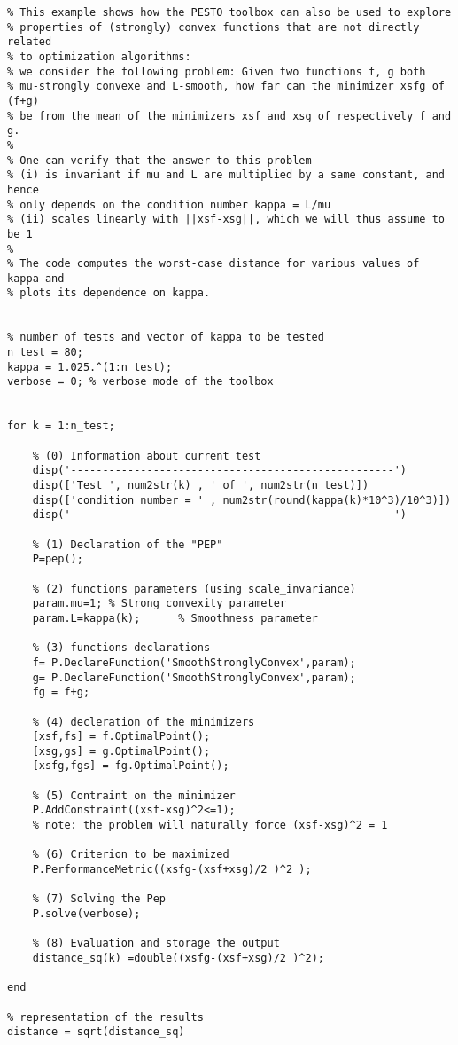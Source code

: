 \documentclass[11pt,a4paper]{article}
\begin{document}
\begin{lstlisting}
% This example shows how the PESTO toolbox can also be used to explore
% properties of (strongly) convex functions that are not directly related
% to optimization algorithms:
% we consider the following problem: Given two functions f, g both
% mu-strongly convexe and L-smooth, how far can the minimizer xsfg of (f+g)
% be from the mean of the minimizers xsf and xsg of respectively f and g.
%
% One can verify that the answer to this problem
% (i) is invariant if mu and L are multiplied by a same constant, and hence
% only depends on the condition number kappa = L/mu
% (ii) scales linearly with ||xsf-xsg||, which we will thus assume to be 1
%
% The code computes the worst-case distance for various values of kappa and
% plots its dependence on kappa.


% number of tests and vector of kappa to be tested
n_test = 80;
kappa = 1.025.^(1:n_test);
verbose = 0; % verbose mode of the toolbox


for k = 1:n_test;

	% (0) Information about current test
	disp('---------------------------------------------------')
	disp(['Test ', num2str(k) , ' of ', num2str(n_test)])
	disp(['condition number = ' , num2str(round(kappa(k)*10^3)/10^3)])
	disp('---------------------------------------------------')

	% (1) Declaration of the "PEP"
	P=pep();

	% (2) functions parameters (using scale_invariance)
	param.mu=1;	% Strong convexity parameter
	param.L=kappa(k);      % Smoothness parameter

	% (3) functions declarations
	f= P.DeclareFunction('SmoothStronglyConvex',param);
	g= P.DeclareFunction('SmoothStronglyConvex',param);
	fg = f+g;

	% (4) decleration of the minimizers
	[xsf,fs] = f.OptimalPoint();
	[xsg,gs] = g.OptimalPoint();
	[xsfg,fgs] = fg.OptimalPoint();

	% (5) Contraint on the minimizer
	P.AddConstraint((xsf-xsg)^2<=1);
	% note: the problem will naturally force (xsf-xsg)^2 = 1

	% (6) Criterion to be maximized
	P.PerformanceMetric((xsfg-(xsf+xsg)/2 )^2 );

	% (7) Solving the Pep
	P.solve(verbose);

	% (8) Evaluation and storage the output
	distance_sq(k) =double((xsfg-(xsf+xsg)/2 )^2);

end

% representation of the results
distance = sqrt(distance_sq)


\end{lstlisting}
\end{document}
